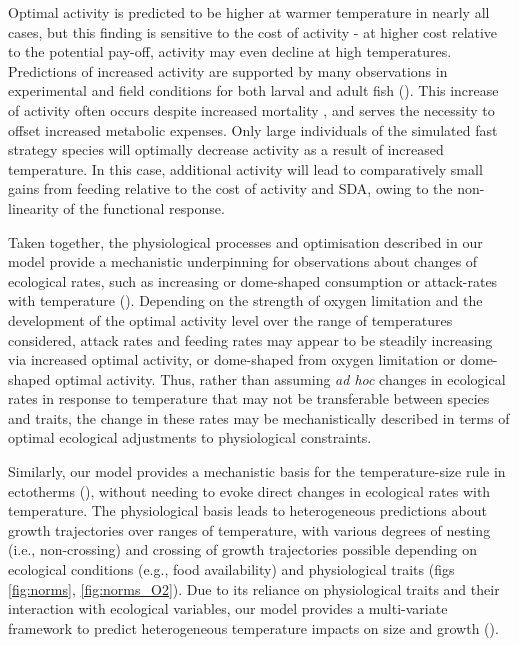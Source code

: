 \documentclass[11pt]{article}\usepackage[]{graphicx}\usepackage[]{color,soul}
\begin{document}
Optimal activity is predicted to be higher at warmer temperature in nearly all cases, but this finding is sensitive to the cost of activity - at higher cost relative to the potential pay-off, activity may even decline at high temperatures. Predictions of increased activity are supported by many observations in experimental and field conditions for both larval and adult fish (\citealt{sswat_growth_2018,brown_feeding_1989,claireaux_physiology_1995, biro_mechanisms_2007}). This increase of activity often occurs despite increased mortality \cite[e.g., ][]{sswat_growth_2018, biro_mechanisms_2007}, and serves the necessity to offset increased metabolic expenses. Only large individuals of the simulated fast strategy species will optimally decrease activity as a result of increased temperature. In this case, additional activity will lead to comparatively small gains from feeding relative to the cost of activity and SDA, owing to the non-linearity of the functional response.

Taken together, the physiological processes and optimisation described in our model provide a mechanistic underpinning for observations about changes of ecological rates, such as
increasing or dome-shaped consumption or attack-rates with temperature
(\citealt{biro_mechanisms_2007,englund_temperature_2011,rall_universal_2012}). Depending on the
strength of oxygen limitation and the development of the optimal
activity level over the range of temperatures considered, attack rates
and feeding rates may appear to be steadily increasing via increased
optimal activity, or dome-shaped from oxygen limitation or dome-shaped
optimal activity. Thus, rather than assuming \emph{ad hoc} changes in ecological rates in response to temperature that may not be transferable between species and traits, the change in these rates may be mechanistically described in terms of optimal ecological adjustments to physiological constraints.

Similarly, our model provides a mechanistic basis for the temperature-size rule in ectotherms (\citealt{atkinson_temperature_1994}), without needing to evoke direct changes in ecological rates with temperature. The physiological basis leads to heterogeneous predictions about growth trajectories over ranges of temperature, with various degrees of nesting (i.e., non-crossing) and crossing of growth trajectories possible depending on ecological conditions (e.g., food availability) and physiological traits (figs \ref{fig:norms}, \ref{fig:norms_O2}). Due to its reliance on physiological traits and their interaction with ecological variables, our model provides a multi-variate framework to predict heterogeneous temperature impacts on size and growth (\citealt{angilletta_temperature_2004}).
\end{document}
